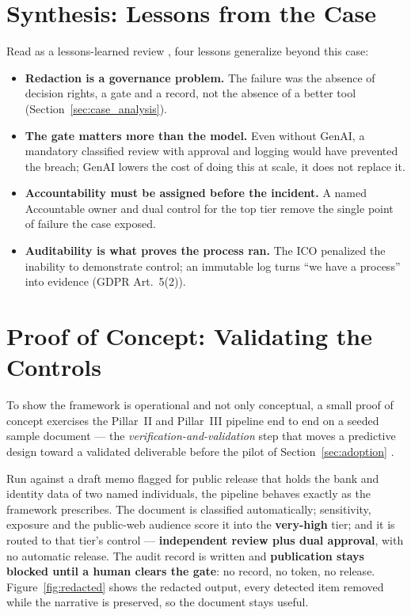 \documentclass[12pt,a4paper]{article}
\begin{document}
\section{Synthesis: Lessons from the Case}
\label{sec:lessons}

Read as a lessons-learned review \cite{falchi_slides}, four lessons generalize beyond this case:

\begin{itemize}
  \item \textbf{Redaction is a governance problem.} The failure was the absence of decision rights, a gate and a record, not the absence of a better tool (Section~\ref{sec:case_analysis}).
  \item \textbf{The gate matters more than the model.} Even without GenAI, a mandatory classified review with approval and logging would have prevented the breach; GenAI lowers the cost of doing this at scale, it does not replace it.
  \item \textbf{Accountability must be assigned before the incident.} A named Accountable owner and dual control for the top tier remove the single point of failure the case exposed.
  \item \textbf{Auditability is what proves the process ran.} The ICO penalized the inability to demonstrate control; an immutable log turns ``we have a process'' into evidence (GDPR Art.~5(2)).
\end{itemize}

\newpage
\section{Proof of Concept: Validating the Controls}
\label{sec:prototype}

To show the framework is operational and not only conceptual, a small proof of concept exercises the Pillar~II and Pillar~III pipeline end to end on a seeded sample document --- the \emph{verification-and-validation} step that moves a predictive design toward a validated deliverable before the pilot of Section~\ref{sec:adoption} \cite{falchi_slides}.

Run against a draft memo flagged for public release that holds the bank and identity data of two named individuals, the pipeline behaves exactly as the framework prescribes. The document is classified automatically; sensitivity, exposure and the public-web audience score it into the \textbf{very-high} tier; and it is routed to that tier's control --- \textbf{independent review plus dual approval}, with no automatic release. The audit record is written and \textbf{publication stays blocked until a human clears the gate}: no record, no token, no release. Figure~\ref{fig:redacted} shows the redacted output, every detected item removed while the narrative is preserved, so the document stays useful.
\end{document}
